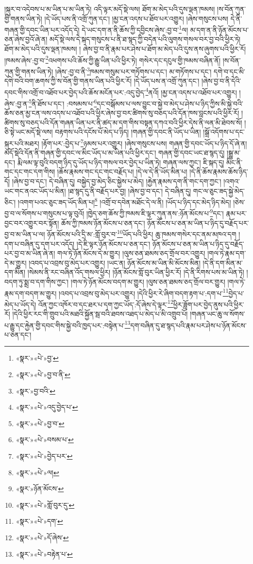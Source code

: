 །སྐུར་བ་འདེབས་པ་མ་ཡིན་པ་མ་ཡིན་ཏེ། འདི་ལྟར་མདོ་སྡེ་ལས། ཐོག་མ་མེད་པའི་དུས་ལྡན་ཁམས། །ས་བོན་ཀུན་གྱི་གནས་ཡིན་ཏེ། །དེ་ཡོད་པས་ནི་འགྲོ་ཀུན་དང་། །མྱ་ངན་འདས་པ་ཐོབ་པར་འགྱུར། །ཞེས་གསུངས་པས། དེ་ནི་གཞན་གྱི་དབང་ཡིན་པར་འདོད་དེ། དེ་ཡང་དག་ན་ནི་ཆོས་ཀྱི་དབྱིངས་ཞེས་:བྱ་བ་\footnote{«སྣར་»«པེ་»བྱ་}ལ། མ་དག་ན་ནི་ཉོན་མོངས་པ་ཅན་ཞེས་བྱའོ་ཞེ་ན། མདོ་སྡེ་ལས་དེ་སྐད་གསུངས་པ་ནི་ཐ་སྙད་ཀྱི་བདེན་པའི་ལུགས་གསལ་བར་བྱ་བའི་ཕྱིར་ཏེ། ཐོག་མ་མེད་པའི་དུས་ལྡན་ཁམས། །
ཞེས་བྱ་བ་ནི་རྣམ་པར་ཤེས་པ་ཐོག་མ་མེད་པའི་དུས་ནས་ཞུགས་པའི་ཕྱིར་རོ། །ཁམས་ཞེས་:བྱ་བ་\footnote{«སྣར་»«པེ་»བྱ་བ་ནི་}འཕགས་པའི་ཆོས་ཀྱི་རྒྱུ་ཡིན་པའི་ཕྱིར་ཏེ། གསེར་དང་དངུལ་གྱི་ཁམས་བཞིན་ནོ། །ས་བོན་ཀུན་གྱི་གནས་ཡིན་ཏེ། །ཞེས་:བྱ་བ་ནི་\footnote{«སྣར་»བྱ་བའི་}ཁམས་གསུམ་པར་གཏོགས་པ་དང་། མ་གཏོགས་པ་དང་། དགེ་བ་དང་མི་དགེ་བའི་བག་ཆགས་ཀྱི་ས་བོན་གྱི་གནས་ཡིན་པའི་ཕྱིར་རོ། །དེ་ཡོད་པས་ན་འགྲོ་ཀུན་དང་། །ཞེས་བྱ་བ་ནི་དེའི་དབང་གིས་འགྲོ་བ་འཐོབ་པར་བྱེད་པའི་ཆོས་མངོན་པར་:འདུ་བྱེད་\footnote{«སྣར་»«པེ་»འདུ་བྱེད་པ་}ནའོ། །མྱ་ངན་འདས་པ་འཐོབ་པར་འགྱུར། །ཞེས་:བྱ་ན་\footnote{«སྣར་»«པེ་»བྱ་བ་}ནི་ཐོས་པ་དང་། :བསམས་པ་\footnote{«སྣར་»«པེ་»བསམ་པ་}དང་བསྒོམས་པ་ལས་བྱུང་བ་སྐྱེ་བ་མེད་པ་ཤེས་པ་ཉིད་ཀྱིས་མི་སྐྱེ་བའི་ཆོས་ཅན་མྱ་ངན་ལས་འདས་པ་འཐོབ་པའི་ཕྱིར་ཞེས་བྱ་བར་ཚིགས་སུ་བཅད་པའི་དོན་ཁས་བླངས་པའི་ཕྱིར་རོ། །ཚིགས་སུ་བཅད་པའི་དོན་གཞན་ཡིན་པར་ནི་ཚད་མ་དག་གིས་བསྟན་དཀའ་བའི་ཕྱིར་དེས་ནི་ལན་མི་ཐེབས་སོ། །ཅི་སྟེ་ཡང་མདོ་སྡེ་ལས། བརྟགས་པའི་དངོས་པོ་མེད་པ་ཉིད། །གཞན་གྱི་དབང་ནི་ཡོད་པ་ཡིན། །སྒྲོ་འདོགས་པ་དང་སྐུར་པའི་མཐར། །རྟོག་པར་:བྱེད་པ་\footnote{«སྣར་»«པེ་»བྱེད་པར་}ཉམས་པར་འགྱུར། །ཞེས་གསུངས་པས། གཞན་གྱི་དབང་ཡོད་པ་ཉིད་དོ་ཞེ་ན། མདོ་སྡེའི་དོན་ནི་གཞན་གྱི་དབང་ལ་མིང་ཡོད་པ་མ་ཡིན་པའི་ཕྱིར་དང་། གཞན་གྱི་དབང་ཡང་ཐ་སྙད་དུ། །སྒྱུ་མ་དང་། རྨི་ལམ་ལྟ་བུའི་བདག་ཉིད་དུ་ཡོད་པ་ཉིད་གསལ་བར་བྱེད་པ་ཡིན་ཏེ། གཞན་ལས་ཀྱང་། ཇི་སྐད་དུ། མིང་ནི་གང་དང་གང་དག་གིས། །ཆོས་རྣམས་གང་དང་གང་བརྗོད་པ། །དེ་ལ་དེ་ནི་ཡོད་མིན་པ། །དེ་ནི་ཆོས་རྣམས་ཆོས་ཉིད་དོ། །ཞེས་བྱ་བ་དང་། དེ་བཞིན་དུ། བསྐྱེད་བྱ་མེད་ཅིང་སྐྱེས་པ་མེད། །རྐྱེན་རྣམས་དག་ནི་གང་དག་ཀྱང་། །འགའ་ཡང་གང་ནའང་ཡོད་པ་མིན། །ཐ་སྙད་དུ་ནི་བརྗོད་པར་བྱ། །ཞེས་བྱ་བ་དང་། དེ་བཞིན་དུ། གང་ལ་ཅུང་ཟད་སྐྱེ་མེད་ཅིང་། །འགག་པའང་ཅུང་ཟད་ཡོད་མིན་པ།\footnote{«སྣར་»«པེ་»ལ།} །འགྲོ་བ་དབེན་མཐོང་དེ་ལ་ནི། །ཡོད་པ་ཉིད་དང་མེད་ཉིད་མེད། །ཅེས་བྱ་བ་ལ་སོགས་པ་གསུངས་པ་ལྟ་བུའོ། །ཁྱེད་ཅག་ཆོས་ཀྱི་ཁམས་ཇི་ལྟར་ཀུན་ནས་:ཉོན་མོངས་པ་\footnote{«སྣར་»ཉོན་མོངས་}དང་། རྣམ་པར་བྱང་བར་འགྱུར་བར་སྟོན། ཆོས་ཀྱི་ཁམས་ཉོན་མོངས་པ་ཅན་དང་། ཉོན་མོངས་པ་ཅན་མ་ཡིན་པ་ཉིད་དུ་བརྗོད་པར་བྱ་བ་མ་ཡིན་པ་ལ། ཉོན་མོངས་པའི་དྲི་མ་:གློ་བུར་བ་\footnote{«སྣར་»«པེ་»གློ་བུར་དུ་}ཡོད་པའི་ཕྱིར། ཆུ་ཁམས་གསེར་དང་ནམ་མཁའ་དག །དག་པ་བཞིན་དུ་དག་པར་འདོད། །དེ་ཇི་ལྟར་ཉོན་མོངས་པ་ཅན་དང་། ཉོན་མོངས་པ་ཅན་མ་ཡིན་པ་ཉིད་དུ་བརྗོད་པར་བྱ་བ་མ་ཡིན་ཞེ་ན། གལ་ཏེ་ཉོན་མོངས་དེ་མ་གྱུར། །ལུས་ཅན་ཐམས་ཅད་གྲོལ་བར་འགྱུར། །གལ་ཏེ་རྣམ་དག་དེ་མ་གྱུར། །འབད་པ་འབྲས་བུ་མེད་པར་འགྱུར། །ཡང་ན། ཉོན་མོངས་མ་ཡིན་མི་མོངས་མིན། །དེ་ནི་དག་མིན་མ་དག་མིན། །སེམས་ནི་རང་བཞིན་འོད་གསལ་ཕྱིར། །ཉོན་མོངས་གློ་བུར་ཡིན་ཕྱིར་རོ། །དེ་ནི་རིགས་པས་མ་ཡིན་ཏེ། །བདག་ཏུ་སྨྲ་བ་དག་གིས་ཀྱང་། །གལ་ཏེ་ཉོན་མོངས་བདག་མ་གྱུར། །ལུས་ཅན་ཐམས་ཅད་གྲོལ་བར་གྱུར། །གལ་ཏེ་རྣམ་དག་བདག་མ་གྱུར། །འབད་པ་འབྲས་བུ་མེད་པར་འགྱུར། །དེའི་ཕྱིར་རེ་ཞིག་བདག་རྟག་པ་:དག་པ་\footnote{«སྣར་»«པེ་»དག་}བྱེད་པ་མེད་པ་ཡོད་དེ། འོན་ཀྱང་འཁོར་བ་དང་ཐར་པ་དག་ཀྱང་ཡོད་:དོ་ཞེས་དེ་ལྟར་\footnote{«སྣར་»«པེ་»དོ་ཞེས་}ཕྱིར་ཟློག་པར་བྱེད་ནུས་པའི་ཕྱིར་རོ། །དེའི་ཕྱིར་རང་གི་གྲུབ་པའི་མཐའི་སྐྱོན་སྦ་བའི་ཐབས་འཐད་པ་མེད་པ་མི་འགྲུབ་པོ། །གཞན་ཡང་ཆུ་ལ་སོགས་པ་རྒྱུ་དང་རྐྱེན་གྱི་དབང་གིས་སྐྱེ་བའི་ཁྱད་པར་:བསྟེན་པ་\footnote{«སྣར་»«པེ་»བརྟེན་པ་}དག་བཞིན་དུ་ཐ་སྙད་པའི་རྣམ་པར་ཤེས་པ་ཉོན་མོངས་པ་ཅན་དང་། 